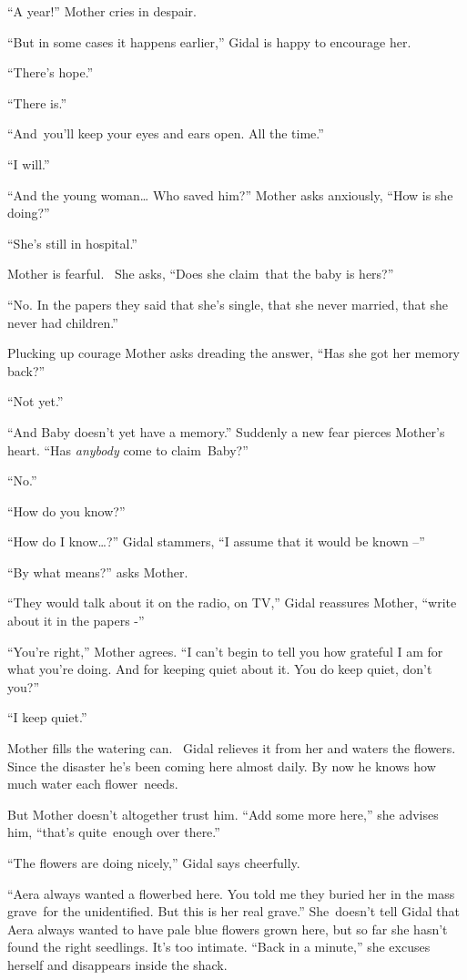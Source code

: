 \documentclass[twoside,11pt]{book}
\begin{document}
``A year!'' Mother cries in despair. 

``But in some cases it happens earlier,'' Gidal is happy to encourage her. 

``There's hope.'' 

``There is.'' 

``And~you'll keep your eyes and ears open. All the time.'' 

``I will.'' 

``And the young woman{\dots} Who saved him?'' Mother asks anxiously, ``How is she
doing?'' 

``She's still in hospital.'' 

Mother is fearful. \ She asks, ``Does she claim{\ }that the baby is hers?'' 

``No. In the papers they said that she's single, that she never married, that she never had
children.'' 

Plucking up courage Mother asks dreading the answer, ``Has she got her memory back?'' 

``Not yet.'' 

``And Baby doesn't yet have a memory.'' Suddenly a new fear pierces Mother's heart.
``Has \textit{anybody }come to claim~Baby?'' 

``No.'' 

``How do you know?''

``How do I know{\dots}?'' Gidal stammers, ``I assume that it would be known
--'' 

``By what means?'' asks Mother.

``They would talk about it on the radio, on TV,'' Gidal reassures Mother, ``write
 about it in the papers -'' 

``You're right,'' Mother agrees. ``I can't begin to tell you how grateful I am
for what you're doing. And for keeping quiet about it. You do keep quiet, don't you?'' 

``I keep quiet.''

Mother fills the watering can. ~Gidal relieves it from her and waters the flowers. Since the disaster he's been coming
here almost daily. By now he knows how much water each flower\ needs. 

But Mother doesn't altogether trust him. ``Add some more here,'' she advises him,
``that's quite~enough over there.'' 

``The flowers are doing nicely,'' Gidal says cheerfully.

``Aera always wanted a flowerbed here. You told me they buried her in the mass grave~for the unidentified.
But this is her real grave.'' She~doesn't tell Gidal that Aera always wanted to have pale blue flowers
grown here, but so far she hasn't found the right seedlings. It's too intimate. ``Back in a
minute,'' she excuses herself and disappears inside the shack.
\end{document}
